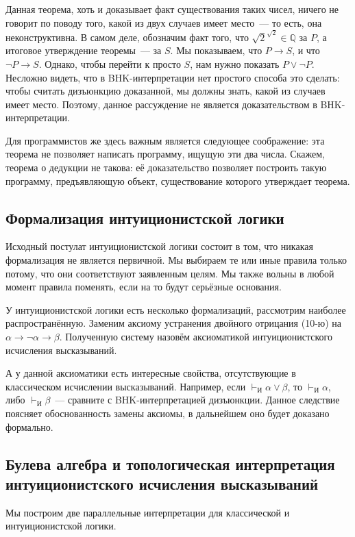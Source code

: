 \documentclass[a4paper,11pt]{article}
\theoremstyle{definition}
\newcommand{\proves}{\vdash}
\begin{document}
Данная теорема, хоть и доказывает факт существования таких чисел, ничего не
говорит по поводу того, какой из двух случаев имеет место~--- то есть, она
неконструктивна. В самом деле, обозначим факт того, что $\sqrt{2}^{\sqrt{2}}
\in \mathbb{Q}$ за $P$, а итоговое утверждение теоремы~--- за $S$. Мы
показываем, что $P \to S$, и что $\neg P \to S$. Однако, чтобы перейти к просто
$S$, нам нужно показать $P \vee \neg P$. Несложно видеть, что в
BHK-интерпретации нет простого способа это сделать: чтобы считать дизъюнкцию
доказанной, мы должны знать, какой из случаев имеет место. Поэтому, данное
рассуждение не является доказательством в BHK-интерпретации.

Для программистов же здесь важным является следующее соображение: эта теорема
не позволяет написать программу, ищущую эти два числа. Скажем, теорема о
дедукции не такова: её доказательство позволяет построить такую программу,
предъявляющую объект, существование которого утверждает теорема.

\subsection*{Формализация интуиционистской логики}
Исходный постулат интуиционистской логики состоит в том, что никакая
формализация не является первичной. Мы выбираем те или иные правила только
потому, что они соответствуют заявленным целям. Мы также вольны в любой момент
правила поменять, если на то будут серьёзные основания.

У интуиционистской логики есть несколько формализаций, рассмотрим наиболее
распространённую. Заменим аксиому устранения двойного отрицания (10-ю) на
$\alpha \to \neg\alpha \to \beta$. Полученную систему назовём аксиоматикой
интуиционистского исчисления высказываний.

А у данной аксиоматики есть интересные свойства, отсутствующие в классическом
исчислении высказываний. Например, если $\proves_{\text{И}} \alpha \vee \beta$,
то $\proves_{\text{И}} \alpha$, либо $\proves_{\text{И}} \beta$~--- сравните с
BHK-интерпретацией дизъюнкции. Данное следствие поясняет обоснованность замены
аксиомы, в дальнейшем оно будет доказано формально.

\subsection{Булева алгебра и топологическая интерпретация интуиционистского исчисления высказываний}
Мы построим две параллельные интерпретации для классической и
интуиционистской логики.
\end{document}
